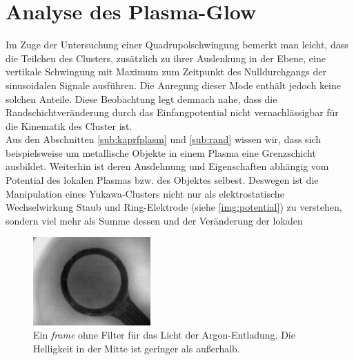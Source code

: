 \documentclass[numbers=noenddot,a4paper,notitlepage,twoside,BCOR15mm]{scrbook}
\newcommand{\tilt}[1]{\textit{#1}}
\begin{document}
		\section{Analyse des Plasma-Glow} \label{sub:glow}

		Im Zuge der Untersuchung einer Quadrupolschwingung bemerkt man leicht, dass die Teilchen des Clusters, zusätzlich zu ihrer Auslenkung in der Ebene, eine vertikale Schwingung mit Maximum zum Zeitpunkt des Nulldurchgangs der sinusoidalen Signale ausführen. Die Anregung dieser Mode enthält jedoch keine solchen Anteile. Diese Beobachtung legt demnach nahe, dass die Randschichtveränderung durch das Einfangpotential nicht vernachlässigbar für die Kinematik des Cluster ist.\\
		Aus den Abschnitten \ref{sub:kaprfplasm} und \ref{sub:rand} wissen wir,  dass sich beispielsweise um metallische Objekte in einem Plasma eine Grenzschicht ausbildet. Weiterhin ist deren Ausdehnung und Eigenschaften abhängig vom Potential des lokalen Plasmas bzw. des Objektes selbest. Deswegen ist die Manipulation eines Yukawa-Clusters nicht nur als elektrostatische Wechselwirkung Staub und Ring-Elektrode (siehe \autoref{img:potential}) zu verstehen, sondern viel mehr als Summe dessen und der Veränderung der lokalen

			\begin{figure}
				\centering
				\includegraphics[width=0.4\textwidth,height=0.3\textwidth]{figs/ringplasmglowoben.png}
				\caption{Ein \tilt{frame} ohne Filter für das Licht der Argon-Entladung. Die Helligkeit in der Mitte ist geringer als außerhalb.}
				\label{img:glow}
				\vspace{-0.2cm}
			\end{figure}
\end{document}

